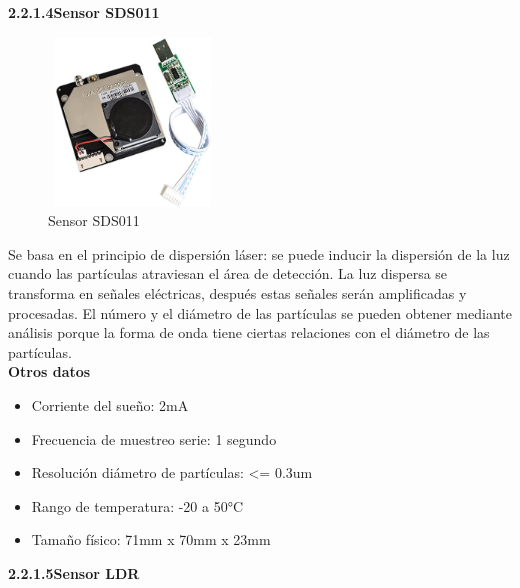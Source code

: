 \newpage

        \textbf{2.2.1.4\hspace{5mm}Sensor SDS011}

\vspace{1cm}

\begin{figure}[H]
      \centering
      \includegraphics[width=4.5cm, height=4.5cm]{imagenes/Sensor SDS011.jpg}
      \caption{Sensor SDS011}
      \label{imag:SDS011}
   \end{figure}

Se basa en el principio de dispersión láser: se puede inducir la dispersión de la luz cuando las partículas atraviesan el área de detección. La luz dispersa se transforma en señales eléctricas, después estas señales serán amplificadas y procesadas. El número y el diámetro de las partículas se pueden obtener mediante análisis porque la forma de onda tiene ciertas relaciones con el diámetro de las partículas.\\

\textbf{Otros datos}

\begin{itemize}
    \item Corriente del sueño: 2mA
    \item Frecuencia de muestreo serie: 1 segundo
    \item Resolución diámetro de partículas: <= 0.3um
    \item Rango de temperatura: -20 a 50°C
    \item Tamaño físico: 71mm x 70mm x 23mm 
\end{itemize}

\vspace{5cm}

        \textbf{2.2.1.5\hspace{5mm}Sensor LDR}\newline

